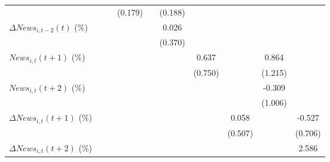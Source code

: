 {\begin{tabular}{l*{9}{c}}
                    &                     &                     &     (0.179)         &                     &     (0.188)         &                     &                     &                     &                     \\
\addlinespace
$ \Delta News_{i,t-2}(t)$ (\%)&                     &                     &                     &                     &       0.026         &                     &                     &                     &                     \\
                    &                     &                     &                     &                     &     (0.370)         &                     &                     &                     &                     \\
\addlinespace
$ News_{i,t}(t+1)$ (\%)&                     &                     &                     &                     &                     &       0.637         &                     &       0.864         &                     \\
                    &                     &                     &                     &                     &                     &     (0.750)         &                     &     (1.215)         &                     \\
\addlinespace
$ News_{i,t}(t+2)$ (\%)&                     &                     &                     &                     &                     &                     &                     &      -0.309         &                     \\
                    &                     &                     &                     &                     &                     &                     &                     &     (1.006)         &                     \\
\addlinespace
$ \Delta News_{i,t}(t+1)$ (\%)&                     &                     &                     &                     &                     &                     &       0.058         &                     &      -0.527         \\
                    &                     &                     &                     &                     &                     &                     &     (0.507)         &                     &     (0.706)         \\
\addlinespace
$ \Delta News_{i,t}(t+2)$ (\%)&                     &                     &                     &                     &                     &                     &                     &                     &       2.586         \\

\end{tabular}}

